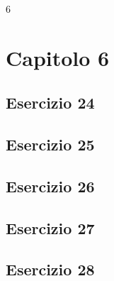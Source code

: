 6\section{\textbf{Capitolo 6}}
\subsection{Esercizio 24}

\subsection{Esercizio 25}

\subsection{Esercizio 26}

\subsection{Esercizio 27}

\subsection{Esercizio 28}

